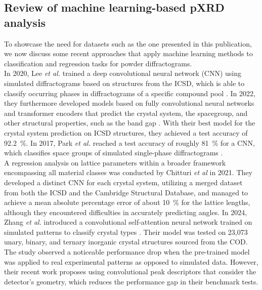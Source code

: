\subsection*{Review of machine learning-based pXRD analysis}
To showcase the need for datasets such as the one presented in this publication, we now discuss some recent approaches that apply machine learning methods to classification and regression tasks for powder diffractograms. \\

In 2020, Lee {\it et al.} trained a deep convolutional neural network (CNN) using simulated diffractograms based on structures from the ICSD, which is able to classify occurring phases in diffractograms of a specific compound pool \cite{Lee2020}. In 2022, they furthermore developed models based on fully convolutional neural networks and transformer encoders that predict the crystal system, the spacegroup, and other structural properties, such as the band gap \cite{Lee2022}. With their best model for the crystal system prediction on ICSD structures, they achieved a test accuracy of \SI{92.2}{\percent}. In 2017, Park {\it et al.} reached a test accuracy of roughly \SI{81}{\percent} for a CNN, which classifies space groups of simulated single-phase diffractograms \cite{Park2017}. \\

A regression analysis on lattice parameters within a broader framework encompassing all material classes was conducted by Chitturi {\it et al} \cite{Chitturi2021} in 2021. They developed a distinct CNN for each crystal system, utilizing a merged dataset from both the ICSD and the Cambridge Structural Database, and managed to achieve a mean absolute percentage error of about \SI{10}{\percent} for the lattice lengths, although they encountered difficulties in accurately predicting angles.
In 2024, Zhang {\it et al.} introduced a convolutional self-attention neural network trained on simulated patterns to classify crystal types \cite{zhang2024crystallographic}. Their model was tested on 23,073 unary, binary, and ternary inorganic crystal structures sourced from the COD. The study observed a noticeable performance drop when the pre-trained model was applied to real experimental patterns as opposed to simulated data. However, their recent work \cite{cao2024simxrd} proposes using convolutional peak descriptors that consider the detector's geometry, which reduces the performance gap in their benchmark tests.\\


